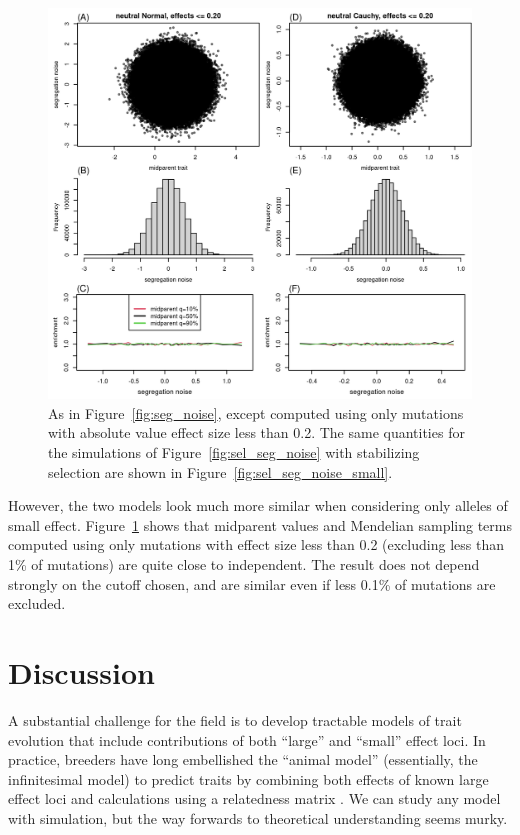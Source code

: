 \documentclass{article}
\newcommand{\1}{\mathbbm{1}}
\theoremstyle{remark}
\theoremstyle{definition}
\begin{document}
\begin{figure}
    \begin{center}
        \includegraphics{sims/neutral_seg_noise_small}
    \end{center}
    \caption{
        As in Figure~\ref{fig:seg_noise},
        except computed using only mutations with absolute value effect size less than 0.2.
        The same quantities for the simulations of Figure~\ref{fig:sel_seg_noise}
        with stabilizing selection are shown in Figure~\ref{fig:sel_seg_noise_small}.
        \label{fig:seg_noise_small}
    }
\end{figure}


However,
the two models look much more similar when considering only alleles of small effect.
Figure~\ref{fig:seg_noise_small} shows that midparent values
and Mendelian sampling terms computed using only mutations with effect size less than 0.2
(excluding less than 1\% of mutations)
are quite close to independent.
The result does not depend strongly on the cutoff chosen,
and are similar even if less 0.1\% of mutations are excluded.

\section{Discussion}

A substantial challenge for the field is to develop tractable models of trait evolution
that include contributions of both ``large'' and ``small'' effect loci.
In practice, breeders have long embellished the ``animal model'' (essentially, the infinitesimal model)
to predict traits
by combining both effects of known large effect loci
and calculations using a relatedness matrix
\citep[e.g.,][]{fernando1989marker,teissier2018weighted,bernardo2014genomewide,rice2019evaluation}.
We can study any model with simulation,
but the way forwards to theoretical understanding seems murky.
\end{document}
